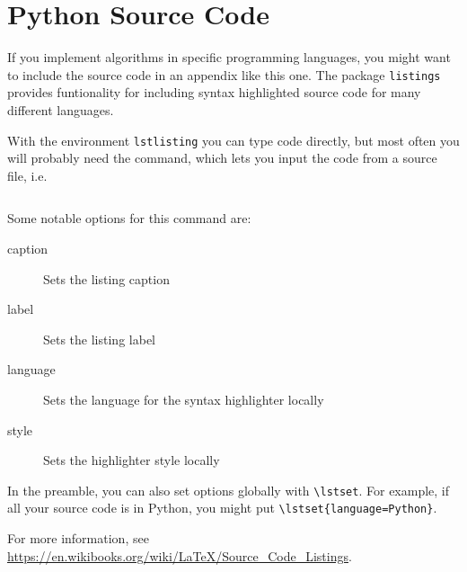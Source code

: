 
\chapter{Python Source Code}
\label{app:code}

If you implement algorithms in specific programming languages, you might want to include the source code in an appendix like this one.
The package \texttt{listings} provides funtionality for including syntax highlighted source code for many different languages.

With the environment \texttt{lstlisting} you can type code directly, but most often you will probably need the \verb!! command, which lets you input the code from a source file, i.e.
%
\begin{verbatim}

\end{verbatim}
%
Some notable options for this command are:
%
\begin{description}
\item[caption] Sets the listing caption
\item[label] Sets the listing label
\item[language] Sets the language for the syntax highlighter locally
\item[style] Sets the highlighter style locally
\end{description}
%
In the preamble, you can also set options globally with \verb!\lstset!.
For example, if all your source code is in Python, you might put \verb!\lstset{language=Python}!.



For more information, see \url{https://en.wikibooks.org/wiki/LaTeX/Source_Code_Listings}.